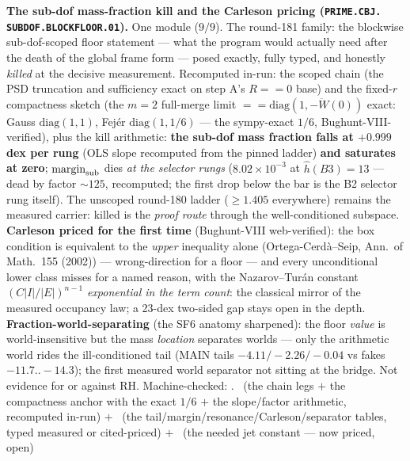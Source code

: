 \par\smallskip\noindent\textbf{The sub-dof mass-fraction kill and
the Carleson pricing (\texttt{PRIME.\allowbreak CBJ.\allowbreak
SUBDOF.\allowbreak BLOCKFLOOR.01}).}
One module ($9/9$).  The round-181 family: the blockwise
sub-dof-scoped floor statement --- what the program would actually
need after the death of the global frame form --- posed exactly,
fully typed, and honestly \emph{killed} at the decisive
measurement.  Recomputed in-run: the scoped chain (the PSD
truncation and sufficiency exact on step A's $R == 0$ base) and
the fixed-$r$ compactness sketch (the $m = 2$ full-merge limit
$== \mathrm{diag}(1, -\ddot W(0))$ exact: Gauss $\mathrm{diag}(1,
1)$, Fej\'er $\mathrm{diag}(1, 1/6)$ --- the sympy-exact $1/6$,
Bughunt-VIII-verified), plus the kill arithmetic: \textbf{the
sub-dof mass fraction falls at $+0.999$ dex per rung} (OLS slope
recomputed from the pinned ladder) \textbf{and saturates at zero};
$\mathrm{margin}_{\rm sub}$ dies \emph{at the selector rungs}
($8.02\times10^{-3}$ at $\hat h(B3) = 13$ --- dead by factor
${\sim}125$, recomputed; the first drop below the bar is the B2
selector rung itself).  The unscoped round-180 ladder ($\ge 1.405$
everywhere) remains the measured carrier: killed is the
\emph{proof route} through the well-conditioned subspace.
\textbf{Carleson priced for the first time} (Bughunt-VIII
web-verified): the box condition is equivalent to the \emph{upper}
inequality alone (Ortega-Cerd\`a--Seip, Ann.\ of Math.\ 155
(2002)) --- wrong-direction for a floor --- and every unconditional
lower class misses for a named reason, with the Nazarov--Tur\'an
constant $(C|I|/|E|)^{n-1}$ \emph{exponential in the term count}:
the classical mirror of the measured occupancy law; a 23-dex
two-sided gap stays open in the depth.
\textbf{Fraction-world-separating} (the SF6 anatomy sharpened):
the floor \emph{value} is world-insensitive but the mass
\emph{location} separates worlds --- only the arithmetic world
rides the ill-conditioned tail (MAIN tails $-4.11/-2.26/-0.04$ vs
fakes $-11.7..-14.3$); the first measured world separator not
sitting at the bridge.  Not evidence for or against RH.
Machine-checked: .
\mE\ (the chain legs $+$ the compactness anchor with the exact
$1/6$ $+$ the slope/factor arithmetic, recomputed in-run) $+$
\mC\ (the tail/margin/resonance/Carleson/separator tables, typed
measured or cited-priced) $+$ \mO\ (the needed jet constant ---
now priced, open)
\par\smallskip


